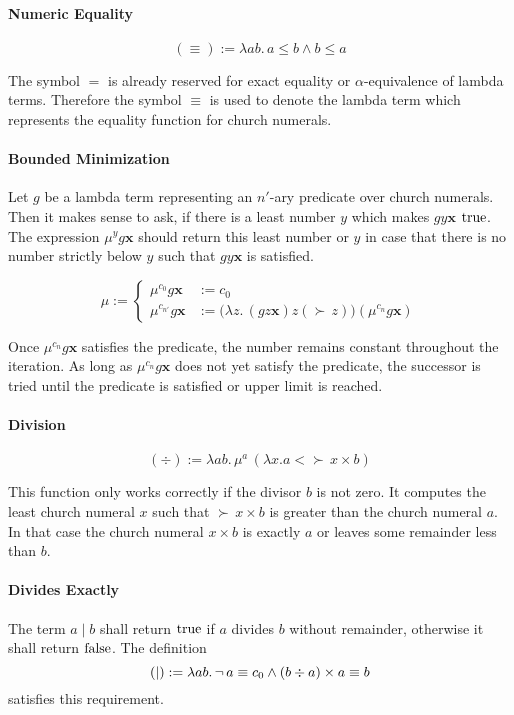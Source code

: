 \paragraph{Numeric Equality}
$$ (\equiv) := \lambda a b.\, a \le b \land b \le a$$

The symbol $=$ is already reserved for exact equality or $\alpha$-equivalence
of lambda terms. Therefore the symbol $\equiv$ is used to denote the lambda
term which represents the equality function for church numerals.


\paragraph{Bounded Minimization} Let $g$ be a lambda term representing an
$n'$-ary predicate over church numerals. Then it makes sense to ask, if there
is a least number $y$ which makes $g y \mathbf{x}$ $\text{true}$. The expression
$\mu^y g \mathbf{x}$ should return this least number or $y$ in case that there
is no number strictly below $y$ such that $g y \mathbf{x}$ is satisfied.

$$\mu :=
\begin{cases}
  \mu^{c_0} g \mathbf{x}    & :=  c_0 \\
  \mu^{c_{n'}} g \mathbf{x} & :=
  \big(\lambda z.\, (g z \mathbf{x}) z (\succ\, z)\big) (\mu^{c_n} g \mathbf{x})
\end{cases}
$$

Once $\mu^{c_n} g \mathbf{x}$ satisfies the predicate, the number remains
constant throughout the iteration. As long as $\mu^{c_n} g \mathbf{x}$ does
not yet satisfy the predicate, the successor is tried until the predicate is
satisfied or upper limit is reached.



\paragraph{Division}
$$ (\div) := \lambda a b.\, \mu^a\, (\lambda x. a < \succ\, x \times b)$$

This function only works correctly if the divisor $b$ is not zero. It computes
the least church numeral $x$ such that $\succ\,x \times b$ is greater than the
church numeral $a$. In that case the church numeral $x \times b$ is exactly
$a$ or leaves some remainder less than $b$.




\paragraph{Divides Exactly} The term $a\mid b$ shall return $\text{true}$ if $a$
divides $b$ without remainder, otherwise it shall return $\text{false}$. The
definition
$$ (\mid) :=
\lambda a b.\,
\neg\, a\equiv c_0 \land
(b \div a)\times a \equiv b
$$
satisfies this requirement.




